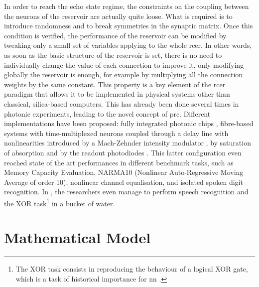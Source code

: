 In order to reach the echo state regime, the constraints on the coupling between the neurons of the reservoir are actually quite loose. What is required is to introduce randomness and to break symmetries in the synaptic matrix. Once this condition is verified, the performance of the reservoir can be modified by tweaking only a small set of variables applying to the whole \gls{rcer}. In other words, as soon as the basic structure of the reservoir is set, there is no need to individually change the value of each connection to improve it, only modifying globally the reservoir is enough, for example by multiplying all the connection weights by the same constant. This property is a key element of the \gls{rcer} paradigm that allows it to be implemented in physical systems other than classical, silica-based computers. This has already been done several times in photonic experiments, leading to the novel concept of \gls{prc}. Different implementations have been proposed: fully integrated photonic chips \cite{Vandoorne2014}, fibre-based systems with time-multiplexed neurons coupled through a delay line with nonlinearities introduced by a Mach-Zehnder intensity modulator \cite{Paquot2012, Antonik2017, Duport2016}, by saturation of absorption \cite{Dejonckheere2014, Vandoorne2008} and by the readout photodiodes \cite{Vinckier2015}. This latter configuration even reached state of the art performances in different benchmark tasks, such as Memory Capacity Evaluation, NARMA10 (Nonlinear Auto-Regressive Moving Average of order 10), nonlinear channel equalisation, and isolated spoken digit recognition. In \cite{Fernando2003}, the researchers even manage to perform speech recognition and the XOR task\footnote{The XOR task consists in reproducing the behaviour of a logical XOR gate, which is a task of historical importance for \gls{nn} \cite{minsky1969perceptrons}.} in a bucket of water. 

\section{Mathematical Model}


